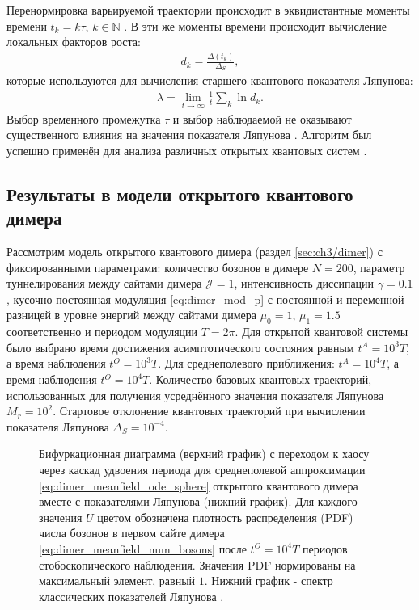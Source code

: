 Перенормировка варьируемой траектории происходит в эквидистантные моменты времени $t_k = k \tau$, $k \in \mathbb{N}$ \cite{Benettin1976}.
В эти же моменты времени происходит вычисление локальных факторов роста:
\begin{equation}
	\label{eq:le_growth_factor}
	\begin{gathered}
		d_k = \frac{\Delta(t_k)}{\Delta_S},
	\end{gathered}
\end{equation}
которые используются для вычисления старшего квантового показателя Ляпунова:
\begin{equation}
	\label{eq:le}
	\begin{gathered}
		\lambda=\lim\limits_{t \to \infty} \frac{1}{t} \sum\limits_k \ln d_k.
	\end{gathered}
\end{equation}
Выбор временного промежутка $\tau$ и выбор наблюдаемой не оказывают существенного влияния на значения показателя Ляпунова \cite{Yusipov2019_2}. Алгоритм был успешно применён для анализа различных открытых квантовых систем \cite{Yusipov2019_2, Yusipov2020, Yusipov2021}.

\subsection{Результаты в модели открытого квантового димера}\label{subsec:ch3/le/dimer}
Рассмотрим модель открытого квантового димера (раздел \cref{sec:ch3/dimer}) с фиксированными параметрами: количество бозонов в димере $N=200$, параметр туннелирования между сайтами димера $\mathcal{J}=1$, интенсивность диссипации $\gamma=0.1$, кусочно-постоянная модуляция \cref{eq:dimer_mod_p} с постоянной и переменной разницей в уровне энергий между сайтами димера $\mu_0=1$, $\mu_1=1.5$ соответственно и периодом модуляции $T=2\pi$. Для открытой квантовой системы было выбрано время достижения асимптотического состояния равным \(t^A = 10^3T\), а время наблюдения \(t^O = 10^3T\). Для среднеполевого приближения: \(t^A = 10^4T\), а время наблюдения \(t^O = 10^4T\). Количество базовых квантовых траекторий, использованных для получения усреднённого значения показателя Ляпунова $M_r=10^2$. Стартовое отклонение квантовых траекторий при вычислении показателя Ляпунова $\Delta_S = 10^{-4}$.

\begin{figure}[ht]
	\centerfloat{
		\texttt{[image: le\_1]}
	}
	\caption[Бифуркационная диаграмма с переходом к хаосу через каскад удвоения периода для среднеполевой аппроксимации открытого квантового димера вместе с показателями Ляпунова]{
		Бифуркационная диаграмма (верхний график) с переходом к хаосу через каскад удвоения периода для среднеполевой аппроксимации \cref{eq:dimer_meanfield_ode_sphere} открытого квантового димера вместе с показателями Ляпунова (нижний график). Для каждого значения $U$ цветом обозначена плотность распределения (PDF) числа бозонов в первом сайте димера \cref{eq:dimer_meanfield_num_bosons} после \(t^O = 10^4T\) периодов стобоскопического наблюдения. Значения PDF нормированы на максимальный элемент, равный $1$. Нижний график - спектр классических показателей Ляпунова \cite{Benettin1976}.
	}
	\label{fig:le_1}
\end{figure}


